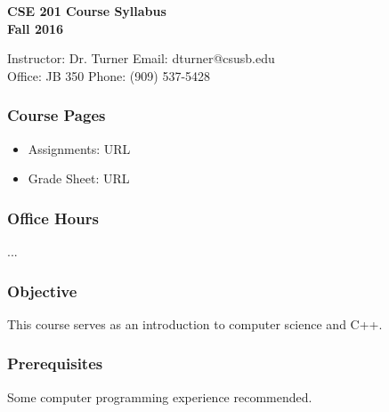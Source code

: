 \documentclass[a4paper,12pt]{article}
\begin{document}
{\centering
\large \bf
CSE 201 Course Syllabus \\
Fall 2016 \\[\baselineskip]
}

Instructor: Dr. Turner \hfill Email: dturner@csusb.edu \\
Office: JB 350 \hfill Phone: (909) 537-5428 \\

\subsubsection*{Course Pages}

\begin{itemize}
\item Assignments: URL
\item Grade Sheet: URL
\end{itemize}

\subsubsection*{Office Hours}

...

\subsubsection*{Objective}

This course serves as an introduction to computer science and C++.

\subsubsection*{Prerequisites}

Some computer programming experience recommended.
\end{document}
